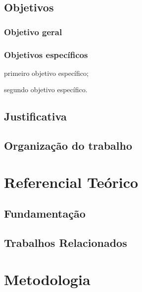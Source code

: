 \documentclass{abntex2-ufv}
\begin{document}
\section{Objetivos}\label{sec:objetivos}

\subsection{Objetivo geral}


\subsection{Objetivos específicos}

\begin{alineas}
  \item primeiro objetivo específico;
  \item segundo objetivo específico.
\end{alineas}

\section{Justificativa}\label{sec:justificativa}

\section{Organização do trabalho}\label{sec:organizacao}

\chapter{Referencial Teórico}\label{sec:RefTeorico}


\section{Fundamentação}\label{sec:fundamentacao}

\section{Trabalhos Relacionados}\label{sec:TrabRel}

\chapter{Metodologia}\label{sec:metodos}
\end{document}
